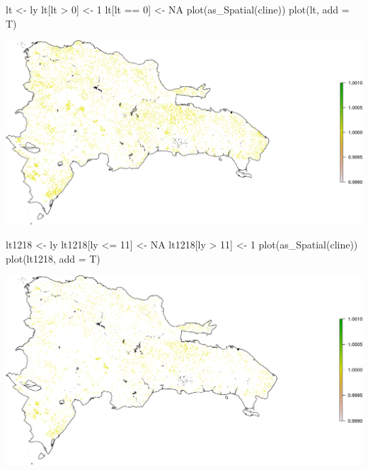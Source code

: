 \documentclass[10pt,landscape,a3paper]{article}
\newenvironment{Shaded}{\begin{snugshade}}{\end{snugshade}}
\newcommand{\AttributeTok}[1]{\textcolor[rgb]{0.77,0.63,0.00}{#1}}
\newcommand{\ConstantTok}[1]{\textcolor[rgb]{0.00,0.00,0.00}{#1}}
\newcommand{\DecValTok}[1]{\textcolor[rgb]{0.00,0.00,0.81}{#1}}
\newcommand{\FunctionTok}[1]{\textcolor[rgb]{0.00,0.00,0.00}{#1}}
\newcommand{\NormalTok}[1]{#1}
\newcommand{\OtherTok}[1]{\textcolor[rgb]{0.56,0.35,0.01}{#1}}
\newcommand{\SpecialCharTok}[1]{\textcolor[rgb]{0.00,0.00,0.00}{#1}}
\begin{document}
\begin{Shaded}
\begin{Highlighting}[]
\NormalTok{lt }\OtherTok{\textless{}{-}}\NormalTok{ ly}
\NormalTok{lt[lt }\SpecialCharTok{\textgreater{}} \DecValTok{0}\NormalTok{] }\OtherTok{\textless{}{-}} \DecValTok{1}
\NormalTok{lt[lt }\SpecialCharTok{==} \DecValTok{0}\NormalTok{] }\OtherTok{\textless{}{-}} \ConstantTok{NA}
\FunctionTok{plot}\NormalTok{(}\FunctionTok{as\_Spatial}\NormalTok{(cline))}
\FunctionTok{plot}\NormalTok{(lt, }\AttributeTok{add =}\NormalTok{ T)}
\end{Highlighting}
\end{Shaded}

\begin{center}\includegraphics{img/year-of-gross-forest-cover-loss-nationwide-2} \end{center}

\begin{Shaded}
\begin{Highlighting}[]
\NormalTok{lt1218 }\OtherTok{\textless{}{-}}\NormalTok{ ly}
\NormalTok{lt1218[ly }\SpecialCharTok{\textless{}=} \DecValTok{11}\NormalTok{] }\OtherTok{\textless{}{-}} \ConstantTok{NA}
\NormalTok{lt1218[ly }\SpecialCharTok{\textgreater{}} \DecValTok{11}\NormalTok{] }\OtherTok{\textless{}{-}} \DecValTok{1}
\FunctionTok{plot}\NormalTok{(}\FunctionTok{as\_Spatial}\NormalTok{(cline))}
\FunctionTok{plot}\NormalTok{(lt1218, }\AttributeTok{add =}\NormalTok{ T)}
\end{Highlighting}
\end{Shaded}

\begin{center}\includegraphics{img/year-of-gross-forest-cover-loss-nationwide-3} \end{center}
\end{document}
